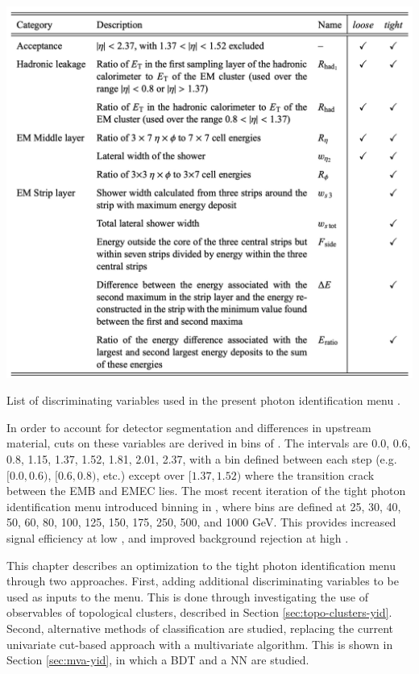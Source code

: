 \begin{table}
    \centering
    \includegraphics[width=.90\textwidth]{chapters/chapter4_photonID/images/ss-table.png}
    \caption[List of discriminating variables used in the present photon identification menu.]
    {List of discriminating variables used in the present photon identification menu \cite{r1-photonID}.}
    \label{tab:ss-vars-table}
\end{table}


In order to account for detector segmentation and differences in upstream material, cuts on these variables are derived in bins of \abseta. The intervals are 0.0, 0.6, 0.8, 1.15, 1.37, 1.52, 1.81, 2.01, 2.37, with a bin defined between each step (e.g. $[0.0,0.6)$, $[0.6,0.8)$, etc.) except over $[1.37,1.52)$ where the transition crack between the \gls{EMB} and \gls{EMEC} lies. The most recent iteration of the tight photon identification menu introduced binning in \pt, where bins are defined at 25, 30, 40, 50, 60, 80, 100, 125, 150, 175, 250, 500, and 1000 GeV. This provides increased signal efficiency at low \pt, and improved background rejection at high \pt.

This chapter describes an optimization to the tight photon identification menu through two approaches. First, adding additional discriminating variables to be used as inputs to the menu. This is done through investigating the use of observables of topological clusters, described in Section \ref{sec:topo-clusters-yid}. Second, alternative methods of classification are studied, replacing the current univariate cut-based approach with a multivariate algorithm. This is shown in Section \ref{sec:mva-yid}, in which a \gls{BDT} and a \gls{NN} are studied.



